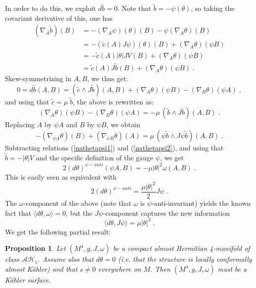 \documentclass{amsart}
\newtheorem{prop}[theorem]{Proposition}
\begin{document}
In order to do this, we exploit $ d \tilde{b} = 0$. Note that $\tilde{b} = - \psi(\theta) $, so taking the covariant derivative of this, one has
\begin{align*}
    (\nabla_A \tilde{b})(B) &= - (\nabla_A \psi)(\theta)(B) - \psi (\nabla_A \theta)(B) \\
                            &=  - (\tilde{c} (A) J\psi )(\theta)(B) + (\nabla_A \theta)(\psi B) \\
                            &= - \tilde{c} (A)  |\theta| JV (B) + (\nabla_A \theta)(\psi B) \\
                            &= \tilde{c} (A) J \tilde{b}(B) + (\nabla_A \theta)(\psi B) \; .
\end{align*}
Skew-symmetrizing in $A, B$, we thus get:
$$ 0 = d \tilde{b}(A,B) = (\tilde{c} \wedge J \tilde{b}) (A,B) + (\nabla_A \theta)(\psi B) - (\nabla_B \theta)(\psi A) \; ,$$
and using that $\tilde{c} = \mu \; \tilde{b}$, the above is rewritten as:
\begin{equation} \label{nathetapsi1}
    (\nabla_A \theta)(\psi B) - (\nabla_B \theta)(\psi A) = - \mu \, (\tilde{b} \wedge J\tilde{b})(A,B) \; .
\end{equation}
Replacing $A$ by $\psi A$ and $B$ by $\psi B$, we obtain
\begin{equation} \label{nathetapsi2}
   - (\nabla_{\psi A} \theta)(B) + (\nabla_{\psi B} \theta)(A) =  \mu \, (\psi \tilde{b} \wedge J\psi\tilde{b})(A,B) \; .
\end{equation}
Subtracting relations (\ref{nathetapsi1}) and (\ref{nathetapsi2}), and using that $\tilde{b} = - |\theta| V$ and the specific definition of the gauge $\psi$, we get
$$ 2 (d\theta)^{\psi - anti}(\psi A, B) = - \mu |\theta|^2 \omega(A, B) \; .$$
This is easily seen as equivalent with
$$ 2 (d\theta)^{\psi - anti} = \frac{\mu |\theta|^2}{2} J\psi \; . $$
The $\omega$-component of the above (note that $\omega$ is $\psi$-anti-invariant) yields the known fact that $\langle d\theta ,\omega \rangle = 0$, but the $J\psi$-component captures the new information 
\begin{equation} \label{dthetaJpsi}
    \langle d\theta , J\psi \rangle = \mu |\theta|^2  \; .
\end{equation}
We get the following partial result:
\begin{prop}
    Let $(M^4, g, J, \omega)$ be a compact almost Hermitian 4-manifold of class $\mathcal{AH}_1$. Assume also that $d \theta = 0$ (i.e. that the structure is locally conformally almost K\"ahler) and that $s\neq 0$ everywhere on $M$. Then $(M^4, g, J, \omega)$ must be a K\"ahler surface.
\end{prop}
\end{document}
